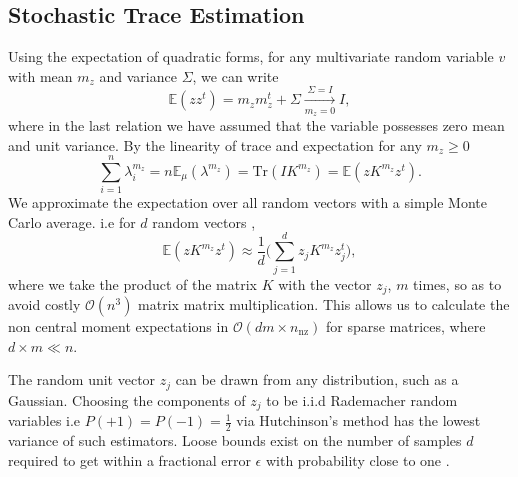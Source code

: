 \documentclass{article}
\begin{document}
\subsection{Stochastic Trace Estimation}
Using the expectation of quadratic forms, for any multivariate random variable $v$ with mean $m_z$ and variance $\Sigma$, we can write 
\begin{equation}
\mathbb{E}(zz^{t}) = m_z m_z^{t}+\Sigma \xrightarrow[m_z = 0]{\Sigma = I} I,
\end{equation}
where in the last relation we have assumed that the variable possesses zero mean and unit variance. By the linearity of trace and expectation for any $m_z \geq 0$
\begin{equation}
\sum_{i=1}^{n}\lambda_{i}^{m_z} = n\mathbb{E}_{\mu}(\lambda^{m_z}) = \text{Tr}(IK^{m_z}) = \mathbb{E}(zK^{m_z}z^{t}).
\end{equation}
We approximate the expectation over all random vectors with a simple Monte Carlo average. i.e for $d$ random vectors ,
\begin{equation}
\mathbb{E}(zK^{m_z}z^{t}) \approx \frac{1}{d}\bigg(\sum_{j=1}^{d}z_{j}K^{m_z}z_{j}^{t} \bigg),
\end{equation}
where we take the product of the matrix $K$ with the vector $z_{j}$, $m$ times, so as to avoid costly $\mathcal{O}(n^{3})$ matrix matrix multiplication. This allows us to calculate the non central moment expectations in $\mathcal{O}(dm\times n_\mathrm{nz})$ for sparse matrices, where $d\times m \ll n$.

The random unit vector $z_{j}$ can be drawn from any distribution, such as a Gaussian. Choosing the components of $z_{j}$ to be i.i.d Rademacher random variables i.e $P(+1)=P(-1) = \frac{1}{2}$ via Hutchinson's method \citep{hutchinson1990stochastic} has the lowest variance of such estimators.
Loose bounds exist on the number of samples $d$ required to get within a fractional error $\epsilon$ with probability close to one \citep{han2015large}.
\end{document}
